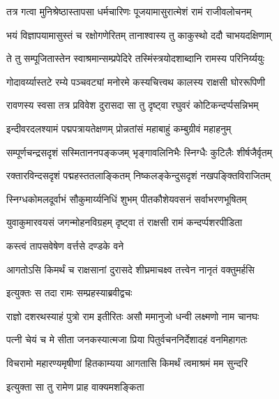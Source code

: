 \twolineshloka
{तत्र गत्वा मुनिश्रेष्ठास्तापसा धर्मचारिणः}
{पूजयामासुरात्मेशं रामं राजीवलोचनम्}%

\twolineshloka
{भयं विज्ञापयामासुस्तं च रक्षोगणेरितम्}
{तानाश्वास्य तु काकुस्थो ददौ चाभयदक्षिणाम्}%

\twolineshloka
{ते तु सम्पूजितास्तेन स्वाश्रमान्सम्प्रपेदिरे}
{तस्मिंस्त्रयोदशाब्दानि रामस्य परिनिर्य्ययुः}%

\twolineshloka
{गोदावर्य्यास्तटे रम्ये पञ्चवट्यां मनोरमे}
{कस्यचित्त्वथ कालस्य राक्षसी घोररूपिणी}%

\twolineshloka
{रावणस्य स्वसा तत्र प्रविवेश दुरासदा}
{सा तु दृष्ट्वा रघुवरं कोटिकन्दर्प्पसन्निभम्}%

\twolineshloka
{इन्दीवरदलश्यामं पद्मपत्रायतेक्षणम्}
{प्रोन्नतांसं महाबाहुं कम्बुग्रीवं महाहनुम्}%

\twolineshloka
{सम्पूर्णचन्द्रसदृशं सस्मिताननपङ्कजम्}
{भृङ्गावलिनिभैः स्निग्धैः कुटिलैः शीर्षजैर्वृतम्}%

\twolineshloka
{रक्तारविन्दसदृशं पद्महस्ततलाङ्कितम्}
{निष्कलङ्केन्दुसदृशं नखपङ्क्तिविराजितम्}%

\twolineshloka
{स्निग्धकोमलदूर्वाभं सौकुमार्य्यनिधिं शुभम्}
{पीतकौशेयवसनं सर्वाभरणभूषितम्}%

\twolineshloka
{युवाकुमारवयसं जगन्मोहनविग्रहम्}
{दृष्ट्वा तं राक्षसी रामं कन्दर्प्पशरपीडिता}%


\onelineshloka
{कस्त्वं तापसवेषेण वर्त्तसे दण्डके वने}%

\twolineshloka
{आगतोऽसि किमर्थं च राक्षसानां दुरासदे}
{शीघ्रमाचक्ष्व तत्त्वेन नानृतं वक्तुमर्हसि}%


इत्युक्तः स तदा रामः सम्प्रहस्याब्रवीद्वचः


\twolineshloka
{राज्ञो दशरथस्याहं पुत्रो राम इतीरितः}
{असौ ममानुजो धन्वी लक्ष्मणो नाम चानघः}%

\twolineshloka
{पत्नी चेयं च मे सीता जनकस्यात्मजा प्रिया}
{पितुर्वचननिर्देशादहं वनमिहागतः}%

\twolineshloka
{विचरामो महारण्यमृषीणां हितकाम्यया}
{आगतासि किमर्थं त्वमाश्रमं मम सुन्दरि}%


\onelineshloka
{इत्युक्ता सा तु रामेण प्राह वाक्यमशङ्किता}%

